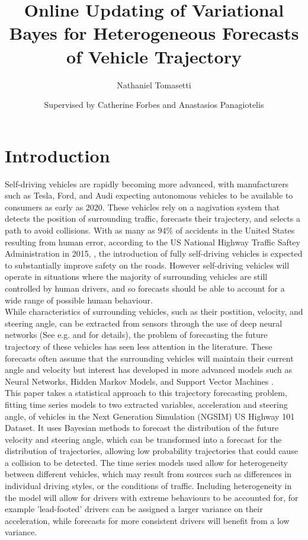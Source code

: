 \documentclass[12pt,a4paper]{article}\usepackage[]{graphicx}\usepackage[]{color}
\title{Online Updating of Variational Bayes for Heterogeneous Forecasts of Vehicle Trajectory}
\author{Nathaniel Tomasetti 
\and Supervised by Catherine Forbes and Anastasios Panagiotelis}
\begin{document}
\maketitle



\section{Introduction}
\label{sec:intro}

Self-driving vehicles are rapidly becoming more advanced, with manufacturers such as Tesla, Ford, and Audi expecting autonomous vehicles to be available to consumers as early as 2020. These vehicles rely on a nagivation system that detects the position of surrounding traffic, forecasts their trajectery, and selects a path to avoid collisions. With as many as $94\%$ of accidents in the United States resulting from human error, according to the US National Highway Traffic Saftey Administration in 2015, \citep{NHTSA2015}, the introduction of fully self-driving vehicles is expected to substantially improve safety on the roads. However self-driving vehicles will operate in situations where the majority of surrounding vehicles are still controlled by human drivers, and so forecasts should be able to account for a wide range of possible human behaviour.
\\

While characteristics of surrounding vehicles, such as their postition, velocity, and steering angle, can be extracted from sensors through the use of deep neural networks (See e.g. \citet{Woo2016a} and \citet{Tian2017} for details), the problem of forecasting the future trajectory of these vehicles has seen less attention in the literature. These forecasts often assume that the surrounding vehicles will maintain their current angle and velocity \citep{Gindele2010, Houenou2013, Bautista2017, Waymo2017} but interest has developed in more advanced models such as Neural Networks, Hidden Markov Models, and Support Vector Machines \citep{Ding2013, Woo2016b, Geng2017, Woo2017}.
\\

This paper takes a statistical approach to this trajectory forecasting problem, fitting time series models to two extracted variables, acceleration and steering angle, of vehicles in the Next Generation Simulation (NGSIM) US Highway 101 Dataset. It uses Bayesian methods to forecast the distribution of the future velocity and steering angle, which can be transformed into a forecast for the distribution of trajectories, allowing low probability trajectories that could cause a collision to be detected. The time series models used allow for heterogeneity between different vehicles, which may result from sources such as differences in individual driving styles, or the conditions of traffic. Including heterogeneity in the model will allow for drivers with extreme behaviours to be accounted for, for example 'lead-footed' drivers can be assigned a larger variance on their acceleration, while forecasts for more consistent drivers will benefit from a low variance.
\\
\end{document}
